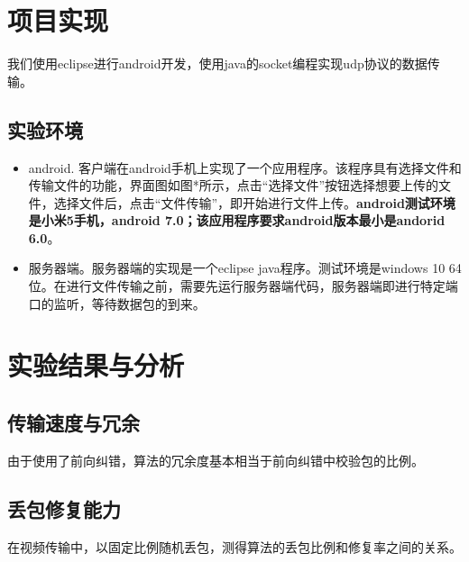 \documentclass[onecolumn]{article}
\begin{document}
\begin{CJK*}{UTF8}{gbsn}
\section{项目实现}
我们使用eclipse进行android开发，使用java的socket编程实现udp协议的数据传输。
\subsection{实验环境}
\begin{itemize}
\item android. 客户端在android手机上实现了一个应用程序。该程序具有选择文件和传输文件的功能，界面图如图*所示，点击“选择文件”按钮选择想要上传的文件，选择文件后，点击“文件传输”，即开始进行文件上传。\textbf{android测试环境是小米5手机，android 7.0；该应用程序要求android版本最小是andorid 6.0}。
\item 服务器端。服务器端的实现是一个eclipse java程序。测试环境是windows 10 64位。在进行文件传输之前，需要先运行服务器端代码，服务器端即进行特定端口的监听，等待数据包的到来。 
\end{itemize}

\section{实验结果与分析}
\subsection{传输速度与冗余}
由于使用了前向纠错，算法的冗余度基本相当于前向纠错中校验包的比例。
\subsection{丢包修复能力}
在视频传输中，以固定比例随机丢包，测得算法的丢包比例和修复率之间的关系。
\end{CJK*}
\end{document}
